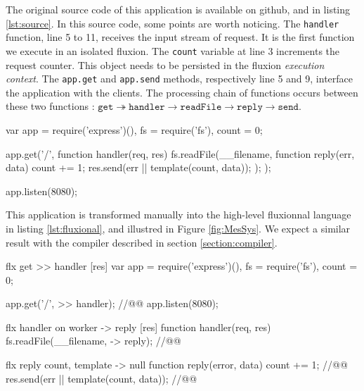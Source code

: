 The original source code of this application is available on github\cite{flx-example}, and in listing \ref{lst:source}.
In this source code, some points are worth noticing.
The \texttt{handler} function, line 5 to 11, receives the input stream of request.
It is the first function we execute in an isolated fluxion.
The \texttt{count} variable at line 3 increments the request counter.
This object needs to be persisted in the fluxion \textit{execution context}.
The \texttt{app.get} and \texttt{app.send} methods, respectively line 5 and 9, interface the application with the clients.
The processing chain of functions occurs between these two functions : $\texttt{get} \twoheadrightarrow \texttt{handler} \to \texttt{readFile} \to \texttt{reply} \to \texttt{send}$.

\begin{code}[js,
  caption={Simple web application that replies to every request with its own source code and a counter},
  label={lst:source}]
var app = require('express')(),
    fs = require('fs'),
    count = 0;

app.get('/', function handler(req, res){
  fs.readFile(__filename, function reply(err, data) {
    count += 1;
    res.send(err || template(count, data));
  });
});

app.listen(8080);
\end{code}

This application is transformed manually into the high-level fluxionnal language in listing \ref{lst:fluxional}, and illustred in Figure \ref{fig:MesSys}.
We expect a similar result with the compiler described in section \ref{section:compiler}.


\begin{code}[flx, caption={Manual transformation of the example application in our high-level fluxional language},label={lst:fluxional}]
flx get
>> handler [res]
  var app = require('express')(),
      fs = require('fs'),
      count = 0;

  app.get('/', >> handler); //@\label{lst:fluxional-streamtohandler}@
  app.listen(8080);

flx handler on worker
-> reply [res]
  function handler(req, res) {
    fs.readFile(__filename, -> reply); //@\label{lst:fluxional-readfile}@
  }

flx reply {count, template}
-> null
  function reply(error, data) {
    count += 1; //@\label{lst:fluxional-counter}@
    res.send(err || template(count, data)); //@\label{lst:fluxional-ressend}@
  }
\end{code}

